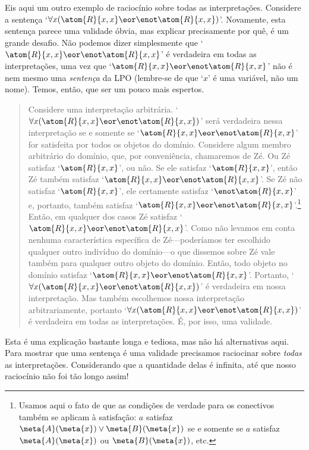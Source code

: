 Eis aqui um outro exemplo de raciocínio sobre todas as interpretações.
Considere a sentença `$\forall x(\atom{R}{x,x}\eor\enot \atom{R}{x,x})$'.
Novamente, esta sentença parece uma validade óbvia, mas explicar precisamente por quê, é um grande desafio.
Não podemos dizer simplesmente que `$\atom{R}{x,x} \eor\enot \atom{R}{x,x}$' é verdadeira em todas as interpretações, uma vez que `$\atom{R}{x,x} \eor\enot \atom{R}{x,x}$' não é nem mesmo uma \emph{sentença} da LPO (lembre-se de que `$x$' é uma variável, não um nome).
Temos, então, que ser um pouco mais espertos.
	\begin{quote}
		Considere uma interpretação arbitrária.
		`$\forall x(\atom{R}{x,x}\eor \enot\atom{R}{x,x})$' será verdadeira nessa interpretação se e somente se `$\atom{R}{x,x}\eor\enot\atom{R}{x,x}$' for satisfeita por todos os objetos do domínio.
		Considere algum membro arbitrário do domínio, que, por conveniência, chamaremos de Zé.
		Ou Zé satisfaz `$\atom{R}{x,x}$', ou não.
		Se ele satisfaz `$\atom{R}{x,x}$', então Zé também satisfaz `$\atom{R}{x,x}\eor\enot\atom{R}{x,x}$'.
		Se Zé não satisfaz `$\atom{R}{x,x}$', ele certamente satisfaz `$\enot\atom{R}{x,x}$' e, portanto, também satisfaz `$\atom{R}{x,x}\eor\enot\atom{R}{x,x}$'.\footnote{
			Usamos aqui o fato de que as condições de verdade para os conectivos também se aplicam à satisfação:
		$a$ satisfaz $\meta{A}(\meta{x}) \lor \meta{B}(\meta{x})$ se e somente se $a$ satisfaz $\meta{A}(\meta{x})$ ou $\meta{B}(\meta{x})$, etc.
		}
		Então, em qualquer dos casos Zé satisfaz `$\atom{R}{x,x} \eor\enot \atom{R}{x,x}$'.
		Como não levamos em conta nenhuma característica específica de Zé---poderíamos ter escolhido qualquer outro indivíduo do domínio---o que dissemos sobre Zé vale também para qualquer outro objeto do domínio.
		Então, todo objeto no domínio satisfaz `$\atom{R}{x,x}\eor\enot\atom{R}{x,x}$'.
		Portanto, `$\forall x (\atom{R}{x,x} \eor\enot \atom{R}{x,x})$' é verdadeira em nossa interpretação.
		Mas também escolhemos nossa interpretação arbitrariamente, portanto `$\forall x (\atom{R}{x,x} \eor\enot \atom{R}{x,x})$' é verdadeira em todas as interpretações.
		É, por isso, uma validade.
	\end{quote}
Esta é uma explicação bastante longa e tediosa, mas não há alternativas aqui. Para mostrar que uma sentença é uma validade precisamos raciocinar sobre \emph{todas} as interpretações.
Considerando que a quantidade delas é infinita, até que nosso raciocínio não foi tão longo assim!


